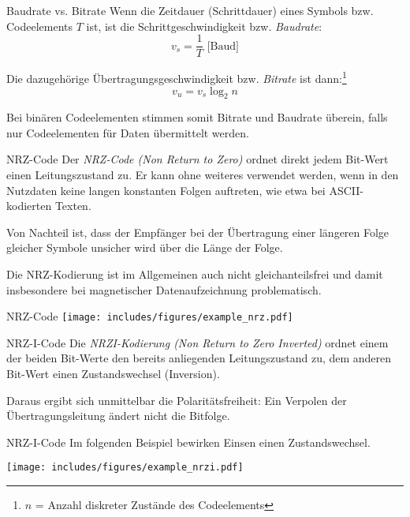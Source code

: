 \begin{bonus}{Baudrate vs. Bitrate}
    Wenn die Zeitdauer (Schrittdauer) eines Symbols bzw. Codeelements $T$ ist, ist die Schrittgeschwindigkeit bzw. \emph{Baudrate}:
    \[
        v_s = \frac{1}{T} \text{ [Baud]}
    \]

    Die dazugehörige Übertragungsgeschwindigkeit bzw. \emph{Bitrate} ist dann:\footnote{$n$ = Anzahl diskreter Zustände des Codeelements}
    \[
        v_u = v_s \log_2 n
    \]

    Bei binären Codeelementen stimmen somit Bitrate und Baudrate überein, falls nur Codeelementen für Daten übermittelt werden.
\end{bonus}

\begin{defi}{NRZ-Code}
    Der \emph{NRZ-Code (Non Return to Zero)} ordnet direkt jedem Bit-Wert einen Leitungszustand zu.
    Er kann ohne weiteres verwendet werden, wenn in den Nutzdaten keine langen konstanten Folgen auftreten, wie etwa bei ASCII-kodierten Texten.

    Von Nachteil ist, dass der Empfänger bei der Übertragung einer längeren Folge gleicher Symbole unsicher wird über die Länge der Folge.

    Die NRZ-Kodierung ist im Allgemeinen auch nicht gleichanteilsfrei und damit insbesondere bei magnetischer Datenaufzeichnung problematisch.
\end{defi}

\begin{example}{NRZ-Code}
    \centering
    \texttt{[image: includes/figures/example\_nrz.pdf]}
\end{example}

\begin{defi}{NRZ-I-Code}
    Die \emph{NRZI-Kodierung (Non Return to Zero Inverted)} ordnet einem der beiden Bit-Werte den bereits anliegenden Leitungszustand zu, dem anderen Bit-Wert einen Zustandswechsel (Inversion).

    Daraus ergibt sich unmittelbar die Polaritätsfreiheit: Ein Verpolen der Übertragungsleitung ändert nicht die Bitfolge.
\end{defi}

\begin{example}{NRZ-I-Code}
    Im folgenden Beispiel bewirken Einsen einen Zustandswechsel.

    \centering
    \texttt{[image: includes/figures/example\_nrzi.pdf]}
\end{example}

